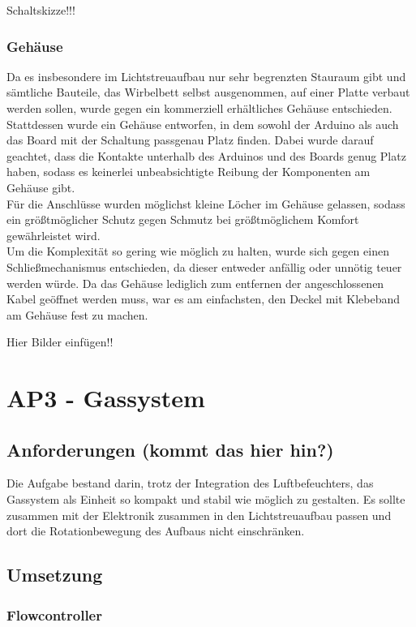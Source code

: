 Schaltskizze!!!

\subsubsection{Gehäuse}

Da es insbesondere im Lichtstreuaufbau nur sehr begrenzten Stauraum gibt und sämtliche Bauteile, das Wirbelbett selbst ausgenommen, auf einer Platte verbaut werden sollen, wurde gegen ein kommerziell erhältliches Gehäuse entschieden. \\ 
Stattdessen wurde ein Gehäuse entworfen, in dem sowohl der Arduino als auch das Board mit der Schaltung passgenau Platz finden. Dabei wurde darauf geachtet, dass die Kontakte unterhalb des Arduinos und des Boards genug Platz haben, sodass es keinerlei unbeabsichtigte Reibung der Komponenten am Gehäuse gibt. \\
Für die Anschlüsse wurden möglichst kleine Löcher im Gehäuse gelassen, sodass ein größtmöglicher Schutz gegen Schmutz bei größtmöglichem Komfort gewährleistet wird. \\
Um die Komplexität so gering wie möglich zu halten, wurde sich gegen einen Schließmechanismus entschieden, da dieser entweder anfällig oder unnötig teuer werden würde. Da das Gehäuse lediglich zum entfernen der angeschlossenen Kabel geöffnet werden muss, war es am einfachsten, den Deckel mit Klebeband am Gehäuse fest zu machen.

Hier Bilder einfügen!!


\section{AP3 - Gassystem}

\subsection{Anforderungen (kommt das hier hin?)}

Die Aufgabe bestand darin, trotz der Integration des Luftbefeuchters, das Gassystem als Einheit so kompakt und stabil wie möglich zu gestalten. Es sollte zusammen mit der Elektronik zusammen in den Lichtstreuaufbau passen und dort die Rotationbewegung des Aufbaus nicht einschränken.


\subsection{Umsetzung}

\subsubsection{Flowcontroller}

